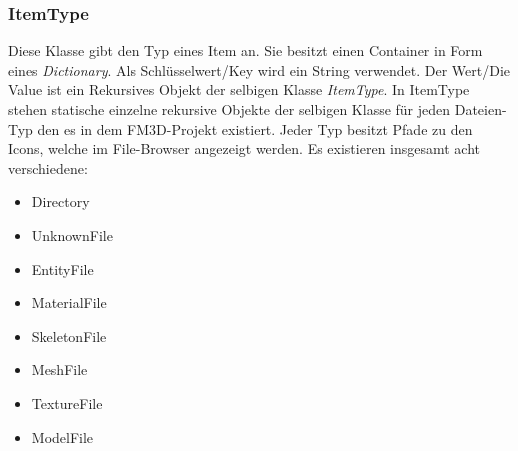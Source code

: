\subsubsection{ItemType}
Diese Klasse gibt den Typ eines Item an. Sie besitzt einen Container in Form eines \textit{Dictionary}. Als Schlüsselwert/Key wird ein String verwendet. Der Wert/Die Value ist ein Rekursives Objekt der selbigen Klasse \textit{ItemType}.
In ItemType stehen statische einzelne rekursive Objekte der selbigen Klasse für jeden Dateien-Typ den es in dem FM3D-Projekt existiert.
Jeder Typ besitzt Pfade zu den Icons, welche im File-Browser angezeigt werden.  Es existieren insgesamt acht verschiedene:
\begin{itemize}
	\item Directory
	\item UnknownFile
	\item EntityFile
	\item MaterialFile
	\item SkeletonFile
	\item MeshFile
	\item TextureFile
	\item ModelFile
\end{itemize}


